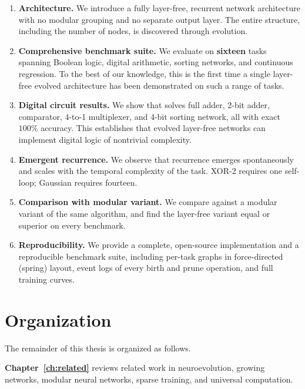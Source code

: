 \begin{enumerate}
  \item \textbf{Architecture.} We introduce a fully layer-free, recurrent
    network architecture with no modular grouping and no separate output
    layer. The entire structure, including the number of nodes, is
    discovered through evolution.

  \item \textbf{Comprehensive benchmark suite.} We evaluate on
    \textbf{sixteen} tasks spanning Boolean logic, digital arithmetic,
    sorting networks, and continuous regression. To the best of our
    knowledge, this is the first time a single layer-free evolved
    architecture has been demonstrated on such a range of tasks.

  \item \textbf{Digital circuit results.} We show that \modnet{} solves
    full adder, 2-bit adder, comparator, 4-to-1 multiplexer, and 4-bit
    sorting network, all with exact $100\%$ accuracy. This establishes
    that evolved layer-free networks can implement digital logic of
    nontrivial complexity.

  \item \textbf{Emergent recurrence.} We observe that recurrence emerges
    spontaneously and scales with the temporal complexity of the task.
    XOR-2 requires one self-loop; Gaussian requires fourteen.

  \item \textbf{Comparison with modular variant.} We compare against a
    modular variant of the same algorithm, and find the layer-free
    variant equal or superior on every benchmark.

  \item \textbf{Reproducibility.} We provide a complete, open-source
    implementation and a reproducible benchmark suite, including per-task
    graphs in force-directed (spring) layout, event logs of every birth
    and prune operation, and full training curves.
\end{enumerate}

\section{Organization}

The remainder of this thesis is organized as follows.

\textbf{Chapter~\ref{ch:related}} reviews related work in neuroevolution,
growing networks, modular neural networks, sparse training, and universal
computation.

